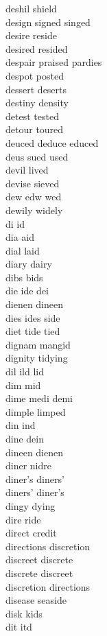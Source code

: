 deshil shield\\
design signed singed\\
desire reside\\
desired resided\\
despair praised pardies\\
despot posted\\
dessert deserts\\
destiny density\\
detest tested\\
detour toured\\
deuced deduce educed\\
deus sued used\\
devil lived\\
devise sieved\\
dew edw wed\\
dewily widely\\
di id\\
dia aid\\
dial laid\\
diary dairy\\
dibs bids\\
die ide dei\\
dienen dineen\\
dies ides side\\
diet tide tied\\
dignam mangid\\
dignity tidying\\
dil ild lid\\
dim mid\\
dime medi demi\\
dimple limped\\
din ind\\
dine dein\\
dineen dienen\\
diner nidre\\
diner's diners'\\
diners' diner's\\
dingy dying\\
dire ride\\
direct credit\\
directions discretion\\
discreet discrete\\
discrete discreet\\
discretion directions\\
disease seaside\\
disk kids\\
dit itd\\
